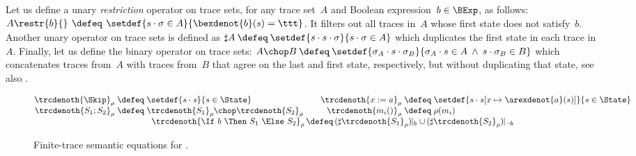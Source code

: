 \documentclass[a4paper,numberwithinsect]{lipics-v2021}
\newcommand{\bordertext}[1]{
\setlength{\fboxsep}{5pt}%
\setlength{\fboxrule}{0.5pt}%
\fbox{\parbox[c]{0.95\textwidth}{#1}}
}
\begin{document}


Let us define a unary \emph{restriction} operator on trace sets, 
for any trace set~$A$ and Boolean expression~$b \in \BExp$, as follows:
%
$
\begin{array}{@{}l@{\,}c@{\,}l@{}}
  A \restr{b}{} & \>\defeq\> & \setdef{s \cdot \sigma \in A}{\bexdenot{b} (s) = \ttt}
\end{array}
$.
%
It filters out all traces in~$A$ whose first state does not
satisfy~$b$.
%
Another unary operator on trace sets is defined as
%
$
\sharp A \>\defeq\> 
\setdef{s \cdot s \cdot \sigma}{s \cdot \sigma \in A}
$
%
which duplicates the first state in each trace in~$A$.
%
Finally, let us define the binary operator on trace sets:
%
$ A \chop B \>\defeq\> \setdef{\sigma_A \cdot s \cdot \sigma_B}
{\sigma_A \cdot s \in A \>\wedge\> s \cdot \sigma_B \in B} $
%
which concatenates traces from~$A$ with traces from~$B$ that agree on
the last and first state, respectively, but without duplicating that
state, see also \cite{HalpernShoham91}.




\begin{figure}
  \centering
$ \begin{array}{@{}r@{\;}c@{\;}l@{\qquad}r@{\;}c@{\;}l@{}}
   \trcdenoth{\Skip}_\rho  & \defeq & 
      \setdef{s \cdot s}{s \in \State} &
   \trcdenoth{x := a}_\rho & \defeq & 
      \setdef{s \cdot s[x \mapsto \arexdenot{a} (s)]}{s \in \State} \\
   \trcdenoth{S_1 ; S_2}_\rho  & \defeq & 
      \trcdenoth{S_1}_\rho \chop \trcdenoth{S_2}_\rho & 
   \trcdenoth{m_i ()}_\rho & \defeq & \rho(m_i) \\ 
    \multicolumn{6}{c}{%
    \trcdenoth{\If\ b\ \Then\ S_1\ \Else\ S_2}_\rho   \,\defeq\,  
      (\sharp \trcdenoth{S_1}_\rho) \!\!\mid_b \cup\, 
      (\sharp \trcdenoth{S_2}_\rho) \!\!\mid_{\neg b}}      \\
   \end{array} $
\caption{Finite-trace semantic equations for \Rec.}
\label{fig:while-tr}
\end{figure}
\end{document}
